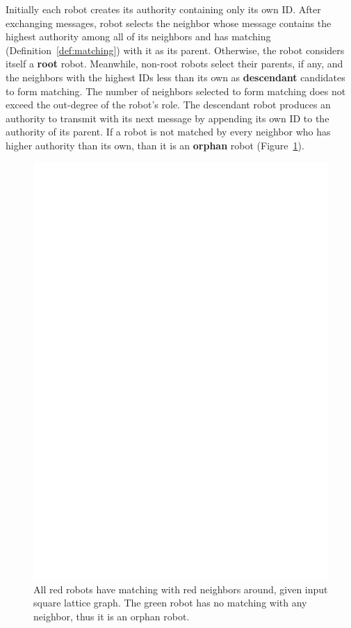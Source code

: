 Initially each robot creates its authority containing only its own ID. 
%
After exchanging messages, robot selects the neighbor whose message contains the highest authority among all of its neighbors and has matching
(Definition~\ref{def:matching}) with it as its parent. 
%
Otherwise, the robot considers itself a \textbf{root} robot. 
%
Meanwhile, non-root robots select their parents, if any, and the neighbors with the highest IDs less than its own as \textbf{descendant} candidates to form matching. 
%
The number of neighbors selected to form matching does not exceed the out-degree of the robot's role. 
%
The descendant robot produces an authority to transmit with its next message by appending its own ID to the authority of its parent. 
%
If a robot is not matched by every neighbor who has higher authority than its own, than it is an \textbf{orphan} robot (Figure~\ref{fig:orphan}).
\begin{figure}
  \centering
  \includegraphics[scale=0.75]{figs/sq17}
  \caption{All red robots have matching with red neighbors around, given input square lattice graph.
           The green robot has no matching with any neighbor, thus it is an orphan robot.}
    \label{fig:orphan}
\end{figure}

